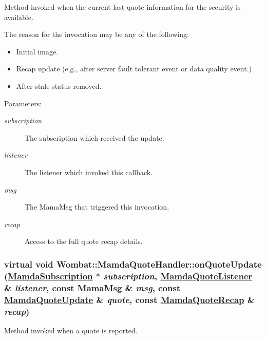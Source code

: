 Method invoked when the current last-quote information for the security is available. 

The reason for the invocation may be any of the following:\begin{itemize}
\item Initial image.\item Recap update (e.g., after server fault tolerant event or data quality event.)\item After stale status removed.\end{itemize}


\begin{Desc}
\item[Parameters:]
\begin{description}
\item[{\em subscription}]The subscription which received the update. \item[{\em listener}]The listener which invoked this callback. \item[{\em msg}]The Mama\-Msg that triggered this invocation. \item[{\em recap}]Access to the full quote recap details. \end{description}
\end{Desc}
\hypertarget{classWombat_1_1MamdaQuoteHandler_6db8e745d6668d72d04114e6d9a908b4}{
\subsubsection[onQuoteUpdate]{\setlength{\rightskip}{0pt plus 5cm}virtual void Wombat::Mamda\-Quote\-Handler::on\-Quote\-Update (\hyperlink{classWombat_1_1MamdaSubscription}{Mamda\-Subscription} $\ast$ {\em subscription}, \hyperlink{classWombat_1_1MamdaQuoteListener}{Mamda\-Quote\-Listener} \& {\em listener}, const Mama\-Msg \& {\em msg}, const \hyperlink{classWombat_1_1MamdaQuoteUpdate}{Mamda\-Quote\-Update} \& {\em quote}, const \hyperlink{classWombat_1_1MamdaQuoteRecap}{Mamda\-Quote\-Recap} \& {\em recap})}}
\label{classWombat_1_1MamdaQuoteHandler_6db8e745d6668d72d04114e6d9a908b4}


Method invoked when a quote is reported. 


